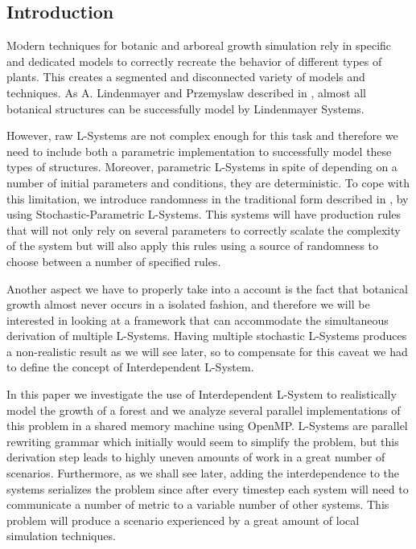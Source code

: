 \documentclass[letterpaper,twoside,11pt]{article}
\begin{document}
\begin{multicols}{2} %

\section{Introduction}
\lettrine[nindent=0em,lines=2]{M}
odern techniques for botanic and arboreal growth simulation rely in specific and dedicated models to correctly recreate the behavior of different types of plants. This creates a segmented and disconnected variety of models and techniques. As A. Lindenmayer and Przemyslaw described in \cite{Prusinkiewicz:1996:ABP:235579}, almost all botanical structures can be successfully model by Lindenmayer Systems.

However, raw L-Systems are not complex enough for this task and therefore we need to include both a parametric implementation to successfully model these types of structures. Moreover, parametric L-Systems in spite of depending on a number of initial parameters and conditions, they are deterministic. To cope with this limitation, we introduce randomness in the traditional form described in \cite{Prusinkiewicz:1996:ABP:235579}, by using Stochastic-Parametric L-Systems. This systems will have production rules that will not only rely on several parameters to correctly scalate the complexity of the system but will also apply this rules using a source of randomness to choose between a number of specified rules.

Another aspect we have to properly take into a account is the fact that botanical growth almost never occurs in a isolated fashion, and therefore we will be interested in looking at a framework that can accommodate the simultaneous derivation of multiple L-Systems. Having multiple stochastic L-Systems produces a non-realistic result as we will see later, so to compensate for this caveat we had to define the concept of Interdependent L-System.

In this paper we investigate the use of Interdependent L-System to realistically model the growth of a forest and we analyze several parallel implementations of this problem in a shared memory machine using OpenMP. L-Systems are parallel rewriting grammar which initially would seem to simplify the problem, but this derivation step leads to highly uneven amounts of work in a great number of scenarios. Furthermore, as we shall see later, adding the interdependence to the systems serializes the problem since after every timestep each system will need to communicate a number of metric to a variable number of other systems. This problem will produce a scenario experienced by a great amount of local simulation techniques.


\end{multicols}
\end{document}
